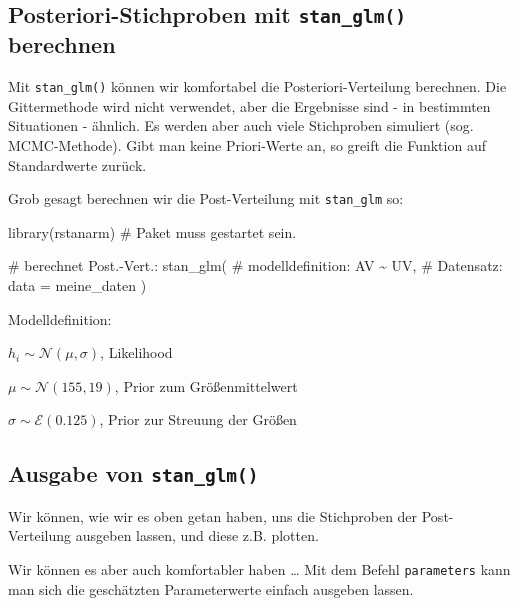\documentclass[
  a4paper,
  DIV=11]{scrreprt}
\newenvironment{Shaded}{\begin{snugshade}}{\end{snugshade}}
\newcommand{\AttributeTok}[1]{\textcolor[rgb]{0.40,0.45,0.13}{#1}}
\newcommand{\CommentTok}[1]{\textcolor[rgb]{0.37,0.37,0.37}{#1}}
\newcommand{\FunctionTok}[1]{\textcolor[rgb]{0.28,0.35,0.67}{#1}}
\newcommand{\NormalTok}[1]{\textcolor[rgb]{0.00,0.23,0.31}{#1}}
\newcommand{\SpecialCharTok}[1]{\textcolor[rgb]{0.37,0.37,0.37}{#1}}
\theoremstyle{definition}
\theoremstyle{remark}
\begin{document}
\hypertarget{posteriori-stichproben-mit-stan_glm-berechnen}{%
\subsection{\texorpdfstring{Posteriori-Stichproben mit
\texttt{stan\_glm()}
berechnen}{Posteriori-Stichproben mit stan\_glm() berechnen}}\label{posteriori-stichproben-mit-stan_glm-berechnen}}

Mit \texttt{stan\_glm()} können wir komfortabel die
Posteriori-Verteilung berechnen. Die Gittermethode wird nicht verwendet,
aber die Ergebnisse sind - in bestimmten Situationen - ähnlich. Es
werden aber auch viele Stichproben simuliert (sog. MCMC-Methode). Gibt
man keine Priori-Werte an, so greift die Funktion auf Standardwerte
zurück.

Grob gesagt berechnen wir die Post-Verteilung mit \texttt{stan\_glm} so:

\begin{Shaded}
\begin{Highlighting}[]
\FunctionTok{library}\NormalTok{(rstanarm)  }\CommentTok{\# Paket muss gestartet sein.}

\CommentTok{\# berechnet Post.{-}Vert.:}
\FunctionTok{stan\_glm}\NormalTok{(}
  \CommentTok{\# modelldefinition:}
\NormalTok{  AV }\SpecialCharTok{\textasciitilde{}}\NormalTok{ UV,}
  \CommentTok{\# Datensatz:}
  \AttributeTok{data =}\NormalTok{ meine\_daten}
\NormalTok{)}
\end{Highlighting}
\end{Shaded}

Modelldefinition:

\(h_i \sim \mathcal{N}(\mu, \sigma)\), Likelihood

\(\mu \sim \mathcal{N}(155, 19)\), Prior zum Größenmittelwert

\(\sigma \sim \mathcal{E}(0.125)\), Prior zur Streuung der Größen

\hypertarget{ausgabe-von-stan_glm}{%
\subsection{\texorpdfstring{Ausgabe von
\texttt{stan\_glm()}}{Ausgabe von stan\_glm()}}\label{ausgabe-von-stan_glm}}

Wir können, wie wir es oben getan haben, uns die Stichproben der
Post-Verteilung ausgeben lassen, und diese z.B. plotten.

Wir können es aber auch komfortabler haben \ldots{} Mit dem Befehl
\texttt{parameters} kann man sich die geschätzten Parameterwerte einfach
ausgeben lassen.
\end{document}
